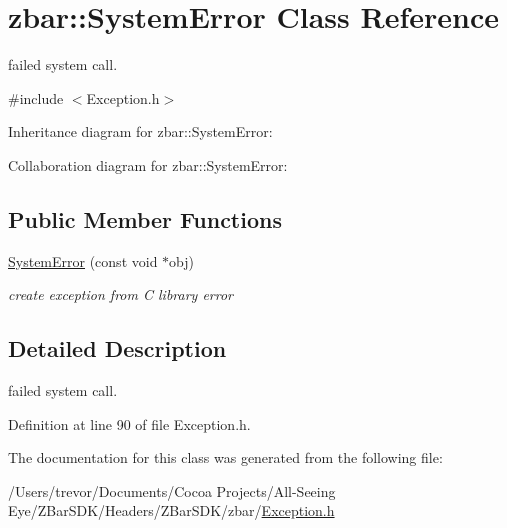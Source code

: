 \hypertarget{classzbar_1_1_system_error}{
\section{zbar::SystemError Class Reference}
\label{classzbar_1_1_system_error}
}


failed system call.  




{\ttfamily \#include $<$Exception.h$>$}



Inheritance diagram for zbar::SystemError:


Collaboration diagram for zbar::SystemError:
\subsection*{Public Member Functions}
\begin{DoxyCompactItemize}
\item 
\hypertarget{classzbar_1_1_system_error_af990164539d6d32fee29dfcdc3a12d9d}{
\hyperlink{classzbar_1_1_system_error_af990164539d6d32fee29dfcdc3a12d9d}{SystemError} (const void $\ast$obj)}
\label{classzbar_1_1_system_error_af990164539d6d32fee29dfcdc3a12d9d}

\begin{DoxyCompactList}\small\item\em create exception from C library error \end{DoxyCompactList}\end{DoxyCompactItemize}


\subsection{Detailed Description}
failed system call. 

Definition at line 90 of file Exception.h.



The documentation for this class was generated from the following file:\begin{DoxyCompactItemize}
\item 
/Users/trevor/Documents/Cocoa Projects/All-\/Seeing Eye/ZBarSDK/Headers/ZBarSDK/zbar/\hyperlink{_exception_8h}{Exception.h}\end{DoxyCompactItemize}
